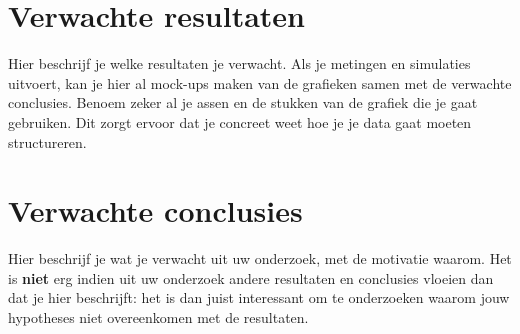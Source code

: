 \documentclass[fleqn,10pt]{voorstel}
\begin{document}
\section{Verwachte resultaten}
Hier beschrijf je welke resultaten je verwacht. Als je metingen en simulaties uitvoert, kan je hier al mock-ups maken van de grafieken samen met de verwachte conclusies. Benoem zeker al je assen en de stukken van de grafiek die je gaat gebruiken. Dit zorgt ervoor dat je concreet weet hoe je je data gaat moeten structureren. 

\section{Verwachte conclusies}
Hier beschrijf je wat je verwacht uit uw onderzoek, met de motivatie waarom. Het is \textbf{niet} erg indien uit uw onderzoek andere resultaten en conclusies vloeien dan dat je hier beschrijft: het is dan juist interessant om te onderzoeken waarom jouw hypotheses niet overeenkomen met de resultaten. 




\end{document}
